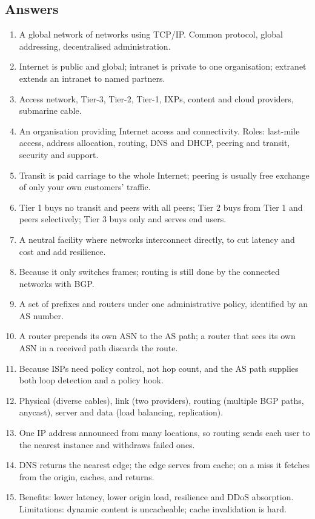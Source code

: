 \documentclass[11pt,a4paper]{article}
\begin{document}
\subsection*{Answers}
\begin{enumerate}
\item A global network of networks using TCP/IP. Common protocol, global addressing, decentralised administration.
\item Internet is public and global; intranet is private to one organisation; extranet extends an intranet to named partners.
\item Access network, Tier-3, Tier-2, Tier-1, IXPs, content and cloud providers, submarine cable.
\item An organisation providing Internet access and connectivity. Roles: last-mile access, address allocation, routing, DNS and DHCP, peering and transit, security and support.
\item Transit is paid carriage to the whole Internet; peering is usually free exchange of only your own customers' traffic.
\item Tier 1 buys no transit and peers with all peers; Tier 2 buys from Tier 1 and peers selectively; Tier 3 buys only and serves end users.
\item A neutral facility where networks interconnect directly, to cut latency and cost and add resilience.
\item Because it only switches frames; routing is still done by the connected networks with BGP.
\item A set of prefixes and routers under one administrative policy, identified by an AS number.
\item A router prepends its own ASN to the AS path; a router that sees its own ASN in a received path discards the route.
\item Because ISPs need policy control, not hop count, and the AS path supplies both loop detection and a policy hook.
\item Physical (diverse cables), link (two providers), routing (multiple BGP paths, anycast), server and data (load balancing, replication).
\item One IP address announced from many locations, so routing sends each user to the nearest instance and withdraws failed ones.
\item DNS returns the nearest edge; the edge serves from cache; on a miss it fetches from the origin, caches, and returns.
\item Benefits: lower latency, lower origin load, resilience and DDoS absorption. Limitations: dynamic content is uncacheable; cache invalidation is hard.

\end{enumerate}
\end{document}
